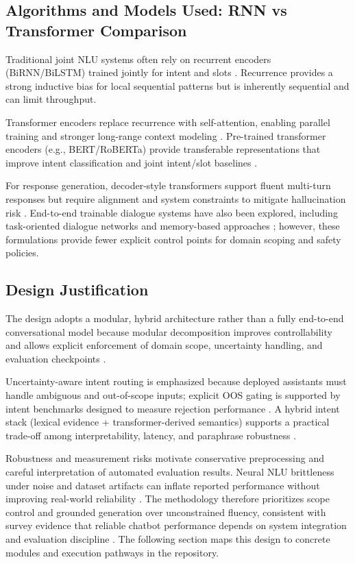 \documentclass[12pt,onecolumn]{report}
\begin{document}
\subsection{Algorithms and Models Used: RNN vs Transformer Comparison}
Traditional joint NLU systems often rely on recurrent encoders (BiRNN/BiLSTM) trained jointly for intent and slots \cite{liu2016joint,hakkani2016multidomain}. Recurrence provides a strong inductive bias for local sequential patterns but is inherently sequential and can limit throughput.

Transformer encoders replace recurrence with self-attention, enabling parallel training and stronger long-range context modeling \cite{vaswani2017attention}. Pre-trained transformer encoders (e.g., BERT/RoBERTa) provide transferable representations that improve intent classification and joint intent/slot baselines \cite{devlin2019bert,liu2019roberta,chen2019bertjoint}.

For response generation, decoder-style transformers support fluent multi-turn responses but require alignment and system constraints to mitigate hallucination risk \cite{radford2019gpt2,ouyang2022rlhf}. End-to-end trainable dialogue systems have also been explored, including task-oriented dialogue networks and memory-based approaches \cite{wen2017network,bordes2017endtoend}; however, these formulations provide fewer explicit control points for domain scoping and safety policies.

\subsection{Design Justification}
The design adopts a modular, hybrid architecture rather than a fully end-to-end conversational model because modular decomposition improves controllability and allows explicit enforcement of domain scope, uncertainty handling, and evaluation checkpoints \cite{hussain2019survey,gao2019neural,khatri2018alexa,roller2021recipes}.

Uncertainty-aware intent routing is emphasized because deployed assistants must handle ambiguous and out-of-scope inputs; explicit OOS gating is supported by intent benchmarks designed to measure rejection performance \cite{larson2019clinc150,casanueva2020banking77}. A hybrid intent stack (lexical evidence + transformer-derived semantics) supports a practical trade-off among interpretability, latency, and paraphrase robustness \cite{devlin2019bert,liu2019roberta}.

Robustness and measurement risks motivate conservative preprocessing and careful interpretation of automated evaluation results. Neural NLU brittleness under noise and dataset artifacts can inflate reported performance without improving real-world reliability \cite{belinkov2018synthetic,sun2020adversarial,gururangan2018annotation,geva2019shortcut,swayamdipta2020dataset}. The methodology therefore prioritizes scope control and grounded generation over unconstrained fluency, consistent with survey evidence that reliable chatbot performance depends on system integration and evaluation discipline \cite{caldarini2022literature,maroengsit2019evaluation}. The following section maps this design to concrete modules and execution pathways in the repository.
\end{document}
